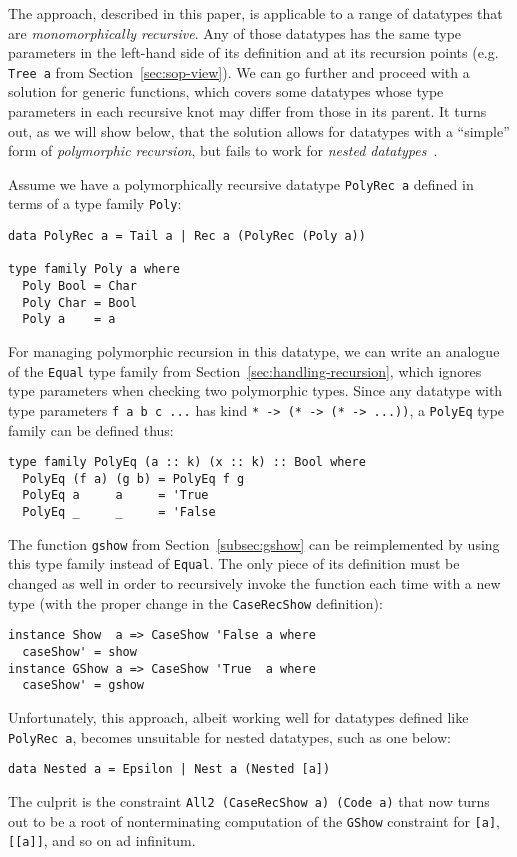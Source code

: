 \documentclass[runningheads]{llncs}
\newcommand{\K}[1]{\lstinline{#1}}
\begin{document}
The approach, described in this paper, is applicable to a range of datatypes that are \emph{monomorphically recursive}. Any of those datatypes has the same type parameters in the left-hand side of its definition and at its recursion points (e.g. \K{Tree a} from Section~\ref{sec:sop-view}). We can go further and proceed with a solution for generic functions, which covers some datatypes whose type parameters in each recursive knot may differ from those in its parent. It turns out, as we will show below, that the solution allows for datatypes with a ``simple'' form of \emph{polymorphic recursion}, but fails to work for \emph{nested datatypes}~\cite{Bird1998}.

Assume we have a polymorphically recursive datatype \K{PolyRec a} defined in terms of a type family \K{Poly}:
\begin{lstlisting}
data PolyRec a = Tail a | Rec a (PolyRec (Poly a))

type family Poly a where
  Poly Bool = Char
  Poly Char = Bool
  Poly a    = a
\end{lstlisting}

For managing polymorphic recursion in this datatype, we can write an analogue of the \K{Equal} type family from Section~\ref{sec:handling-recursion}, which ignores type parameters when checking two polymorphic types. Since any datatype with type parameters \K{f a b c ...} has kind \K{* -> (* -> (* -> ...))}, a \K{PolyEq} type family can be defined thus:
\begin{lstlisting}
type family PolyEq (a :: k) (x :: k) :: Bool where
  PolyEq (f a) (g b) = PolyEq f g
  PolyEq a     a     = 'True
  PolyEq _     _     = 'False
\end{lstlisting}

The function \K{gshow} from Section~\ref{subsec:gshow} can be reimplemented by using this type family instead of \K{Equal}. The only piece of its definition must be changed as well in order to recursively invoke the function each time with a new type (with the proper change in the \K{CaseRecShow} definition):
\begin{lstlisting}
instance Show  a => CaseShow 'False a where
  caseShow' = show
instance GShow a => CaseShow 'True  a where
  caseShow' = gshow
\end{lstlisting}

Unfortunately, this approach, albeit working well for datatypes defined like \K{PolyRec a}, becomes unsuitable for nested datatypes, such as one below:
\begin{lstlisting}
data Nested a = Epsilon | Nest a (Nested [a])
\end{lstlisting}
The culprit is the constraint \K{All2 (CaseRecShow a) (Code a)} that now turns out to be a root of nonterminating computation of the \K{GShow} constraint for \K{[a]}, \K{[[a]]}, and so on ad infinitum.
\end{document}
